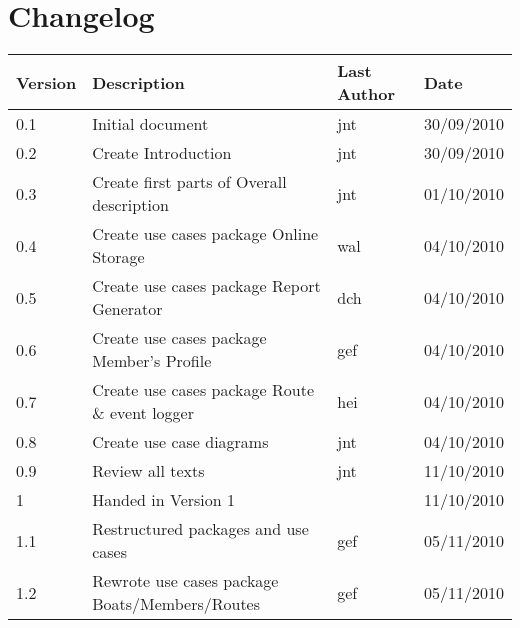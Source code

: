 \section*{Changelog}

\begin{table}[h!]
	\begin{center}
		\begin{tabular}{|l|l|l|l|}
			\hline
			\rowcolor{fontys_pink_light}Version	&Description	&Last Author	&Date\\
			\hline
			0.1	&Initial document	&jnt	&30/09/2010\\
			\hline
			0.2	&Create Introduction	&jnt	&30/09/2010\\
			\hline
			0.3	&Create first parts of Overall description	&jnt	&01/10/2010\\
			\hline
			0.4	&Create use cases package Online Storage&wal	&04/10/2010\\
			\hline
			0.5	&Create use cases package Report Generator	&dch	&04/10/2010\\
			\hline
			0.6	&Create use cases package Member's Profile	&gef	&04/10/2010\\
			\hline
			0.7	&Create use cases package Route \& event logger	&hei	&04/10/2010\\
			\hline
			0.8	&Create use case diagrams	&jnt	&04/10/2010\\
			\hline
			0.9	&Review all texts	&jnt	&11/10/2010\\
			\hline
			\rowcolor{fontysgreen2}1	& Handed in Version 1 & &11/10/2010\\
			\hline
			1.1	&Restructured packages and use cases	&gef	&05/11/2010\\
			\hline
			1.2	&Rewrote use cases package Boats/Members/Routes	&gef	&05/11/2010\\

		\hline
		\end{tabular}
	\end{center}
	\label{tab:changelog}
\end{table}
